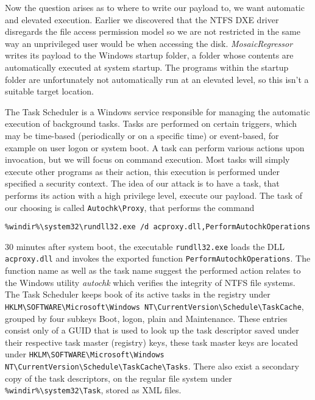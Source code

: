 Now the question arises as to where to write our payload to, we want automatic and elevated execution.
Earlier we discovered that the \ac{NTFS} \ac{DXE} driver disregards the file access permission model  so we are not restricted in the same way an unprivileged user would be when accessing the disk.
\emph{MosaicRegressor} writes its payload to the Windows startup folder, a folder whose contents are automatically executed at system startup.
The programs within the startup folder are unfortunately not automatically run at an elevated level, so this isn't a suitable target location.


The Task Scheduler is a Windows service responsible for managing the automatic execution of background tasks\cite[10. The Task Scheduler]{windows-internals-7-part2}.
Tasks are performed on certain triggers, which may be time-based (periodically or on a specific time) or event-based, for example on user logon or system boot\cite{microsoft-task-scheduler-triggers}.
A task can perform various actions upon invocation\cite{microsoft-task-scheduler-actions}, but we will focus on command execution.
Most tasks will simply execute other programs as their action, this execution is performed under specified a security context\cite{microsoft-task-scheduler-security-contexts}.
The idea of our attack is to have a task, that performs its action with a high privilege level, execute our payload.
The task of our choosing is called \lstinline{Autochk\Proxy}, that performs the command

\begin{lstlisting}
%windir%\system32\rundll32.exe /d acproxy.dll,PerformAutochkOperations
\end{lstlisting}

30 minutes after system boot, the executable \lstinline{rundll32.exe} loads the \ac{DLL} \lstinline{acproxy.dll} and invokes the exported function \lstinline{PerformAutochkOperations}\cite{microsoft-rundll32}.
The function name as well as the task name suggest the performed action relates to the Windows utility \emph{autochk} which verifies the integrity of \ac{NTFS} file systems\cite{microsoft-autochk}.
The Task Scheduler keeps book of its active tasks in the registry under \lstinline{HKLM\SOFTWARE\Microsoft\Windows NT\CurrentVersion\Schedule\TaskCache}, grouped by four subkeys Boot, logon, plain and Maintenance.
These entries consist only of a \ac{GUID} that is used to look up the task descriptor saved under their respective task master (registry) keys, these task master keys are located under \lstinline{HKLM\SOFTWARE\Microsoft\Windows NT\CurrentVersion\Schedule\TaskCache\Tasks}\cite[10. The Task Scheduler - Initialization]{windows-internals-7-part2}.
There also exist a secondary copy of the task descriptors, on the regular file system under \lstinline{%windir%\system32\Task}, stored as \ac{XML} files.

